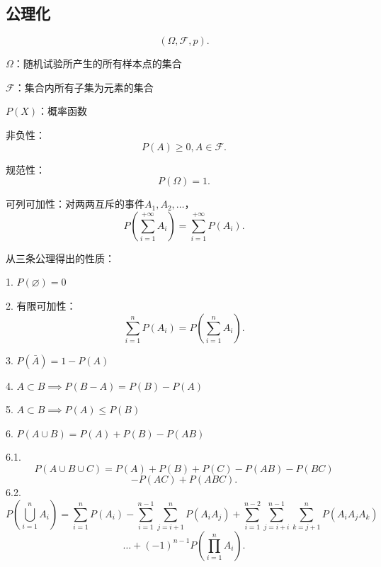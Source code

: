 \subsection{公理化}%
\label{sub:公理化}
\[
    \left( \Omega,\mathscr{F},p \right) 
.\] 
\begin{defi}
    $\Omega$：随机试验所产生的所有样本点的集合

    $\mathscr{F}$：集合内所有子集为元素的集合

    $P\left( X \right) $：概率函数
\end{defi}

\begin{axiom}
    非负性：\[
        P\left( A \right) \ge 0,A\in \mathscr{F}
    .\] 
\end{axiom}
\begin{axiom}
    规范性：\[
        P\left( \Omega \right) =1
    .\] 
\end{axiom}
\begin{axiom}
    可列可加性：对两两互斥的事件$A_1,A_2,\ldots$，\[
        P\left( \sum_{i=1}^{+\infty} A_i \right) =\sum_{i=1}^{+\infty} P\left( A_i \right) 
    .\] 
\end{axiom}
从三条公理得出的性质：
\begin{notation}
    1. $P\left( \varnothing \right) =0$ 

    2. 有限可加性： \[
        \sum_{i=1}^{n} P\left( A_i \right) =P\left( \sum_{i=1}^{n} A_i \right) 
    .\] 

    3. $P\left( \bar{A} \right) =1-P\left( A \right) $

    4. $A\subset B\implies P\left( B-A \right) =P\left( B \right) -P\left( A \right) $

    5. $A\subset B\implies P\left( A \right) \le P\left( B \right) $

    6. $P\left( A\cup B \right) =P\left( A \right) +P\left( B \right) -P\left( AB \right) $
\end{notation}
\begin{notation}
    6.1. \[
    P\left( A\cup B\cup C \right) =P\left( A \right) +P\left( B \right) +P\left( C \right) -P\left( AB \right) -P\left( BC \right) 
    \]
    \[
    -P\left( AC \right) +P\left( ABC \right) 
    .\] 
    6.2. \[
        P\left( \bigcup_{i=1}^{n}A_i \right) =\sum_{i=1}^{n} P\left( A_i \right) -\sum_{i=1}^{n-1} \sum_{j=i+1}^{n} P\left( A_{i}A_{j} \right)+\sum_{i=1}^{n-2} \sum_{j=i+i}^{n-1} \sum_{k=j+1}^{n} P\left( A_{i}A_{j}A_{k} \right) 
    \]
    \[
        \ldots+\left( -1 \right) ^{n-1}P\left( \prod_{i=1}^{n} A_{i}\right)  
    .\] 
\end{notation}

